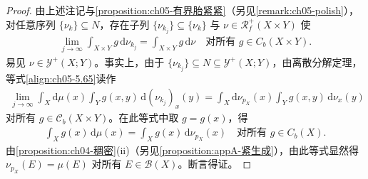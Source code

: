 \documentclass[../../main.tex]{subfiles}%
\begin{document}
\begin{proof}
由上述注记与\cref{proposition:ch05-有界胎紧紧}（另见\cref{remark:ch05-polish}），对任意序列 $\{\nu_k\}\subseteq N$，存在子列 $\{\nu_{k_j}\}\subseteq\{\nu_k\}$ 与 $\nu\in\mathscr{R}^+_f(X\times Y)$ 使
\begin{align}
\lim_{j\to\infty}\int_{X\times Y}g\,\mathrm{d}\nu_{k_j}
=\int_{X\times Y}g\,\mathrm{d}\nu
\quad\text{对所有 }g\in C_b(X\times Y).\label{align:ch05-5.65}
\end{align}
易见 $\nu\in\mathcal{Y}^+(X;Y)$。事实上，由于 $\{\nu_{k_j}\}\subseteq N\subseteq\mathcal{Y}^+(X;Y)$，由离散分解定理，等式\eqref{align:ch05-5.65}读作
\begin{align*}
\lim_{j\to\infty}\int_X\mathrm{d}\mu(x)\int_Y g(x,y)\,\mathrm{d}(\nu_{k_j})_x(y)
=\int_X\mathrm{d}\nu_{p_X}(x)\int_Y g(x,y)\,\mathrm{d}\nu_x(y)
\end{align*}
对所有 $g\in\mathcal{C}_b(X\times Y)$。在此等式中取 $g=g(x)$，得
\begin{align*}
\int_X g(x)\,\mathrm{d}\mu(x)=\int_X g(x)\,\mathrm{d}\nu_{p_X}(x)
\quad\text{对所有 }g\in C_b(X).
\end{align*}
由\cref{proposition:ch04-稠密}(ii)（另见\cref{proposition:appA-紧生成}），由此等式显然得 $\nu_{p_X}(E)=\mu(E)$ 对所有 $E\in\mathscr{B}(X)$。断言得证。


\end{proof}
\end{document}
